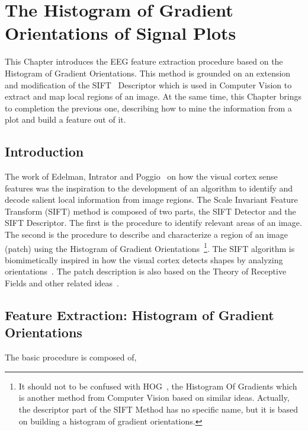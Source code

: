 \chapter{The Histogram of Gradient Orientations of Signal Plots}
\label{chapter:three}

This Chapter introduces the EEG feature extraction procedure based on the Histogram of Gradient Orientations.  This method is grounded on an extension and modification of the SIFT~\cite{Lowe2004} Descriptor which is used in Computer Vision to extract and map local regions of an image.  At the same time, this Chapter brings to completion the previous one, describing how to mine the information from a plot and build a feature out of it.

\section{Introduction}


The work of Edelman, Intrator and Poggio~\cite{Edelman1997} on how the visual cortex sense features was the inspiration to the development of an algorithm to identify and decode salient local information from image regions.  The Scale Invariant Feature Transform (SIFT) method is composed of two parts, the SIFT Detector and the SIFT Descriptor.  The first is the procedure to identify relevant areas of an image.  The second is the procedure to describe and characterize a region of an image (patch) using the Histogram of Gradient Orientations~\footnote{It should not to be confused with HOG~\cite{Dalal2005}, the Histogram Of Gradients which is another method from Computer Vision based on similar ideas.  Actually, the descriptor part of the SIFT Method has no specific name, but it is based on building a histogram of gradient orientations.}.  The SIFT algorithm is biomimetically inspired in how the visual cortex detects shapes by analyzing orientations~\cite{Edelman1997}.  The patch description is also based on the Theory of Receptive Fields and other related ideas~\cite{Lindeberg2013}.

\pagebreak

\section{Feature Extraction: Histogram of Gradient Orientations}
\label{SIFT}

The basic procedure is composed of,

